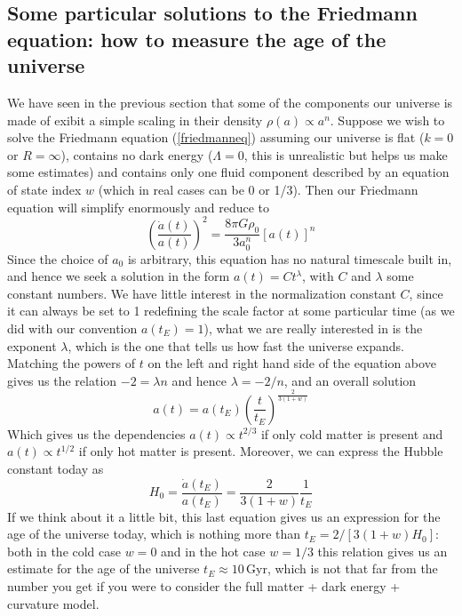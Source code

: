 \documentclass[11pt, a4paper,oneside,openright]{book}
\numberwithin{equation}{section}
\begin{document}
\subsection{Some particular solutions to the Friedmann equation: how to measure the age of the universe}
We have seen in the previous section that some of the components our universe is made of exibit a simple scaling in their density $\rho(a)\propto a^{n}$. Suppose we wish to solve the Friedmann equation (\ref{friedmanneq}) assuming our universe is flat ($k=0$ or $R=\infty$), contains no dark energy ($\Lambda = 0$, this is unrealistic but helps us make some estimates) and contains only one fluid component described by an equation of state index $w$ (which in real cases can be 0 or 1/3). Then our Friedmann equation will simplify enormously and reduce to 
\begin{equation}
\left(\frac{\dot{a}(t)}{a(t)}\right)^2=\frac{8\pi G\rho_0}{3a_0^n}[a(t)]^n
\end{equation}
Since the choice of $a_0$ is arbitrary, this equation has no natural timescale built in, and hence we seek a solution in the form $a(t)=Ct^\lambda$, with $C$ and $\lambda$ some constant numbers. We have little interest in the normalization constant $C$, since it can always be set to 1 redefining the scale factor at some particular time (as we did with our convention $a(t_E)=1$), what we are really interested in is the exponent $\lambda$, which is the one that tells us how fast the universe expands. Matching the powers of $t$ on the left and right hand side of the equation above gives us the relation $-2=\lambda n$ and hence $\lambda=-2/n$, and an overall solution
\begin{equation}
a(t)=a(t_E)\left(\frac{t}{t_E}\right)^{\frac{2}{3(1+w)}}
\end{equation}
Which gives us the dependencies $a(t)\propto t^{2/3}$ if only cold matter is present and $a(t)\propto t^{1/2}$ if only hot matter is present. Moreover, we can express the Hubble constant today as
\begin{equation}
H_0=\frac{\dot{a}(t_E)}{a(t_E)}=\frac{2}{3(1+w)}\frac{1}{t_E}
\end{equation}
If we think about it a little bit, this last equation gives us an expression for the age of the universe today, which is nothing more than $t_E=2/[3(1+w)H_0]$: both in the cold case $w=0$ and in the hot case $w=1/3$ this relation gives us an estimate for the age of the universe $t_E\approx 10$\,Gyr, which is not that far from the number you get if you were to consider the full matter + dark energy + curvature model. 
\end{document}
